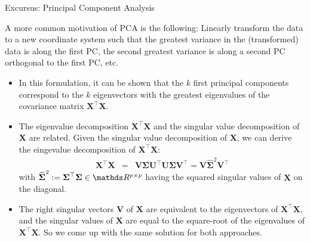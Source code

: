 \begin{vbframe}{Excursus: Principal Component Analysis}
\framebreak

A more common motivation of PCA is the following: Linearly transform the data to a new coordinate system such that the greatest variance in the (transformed) data is along the first PC, the second greatest variance is along a second PC orthogonal to the first PC, etc. 

\begin{itemize}
	\item In this formulation, it can be shown that the $k$ first principal components correspond to the $k$ eigenvectors with the greatest eigenvalues of the covariance matrix $\bm{X}^\top \bm{X}$. 
	\item The eigenvalue decomposition $\bm{X}^\top \bm{X}$ and the singular value decomposition of $\bm{X}$ are related. Given the singular value decomposition of $\bm{X}$, we can derive the eingevalue decomposition of $\bm{X}^\top \bm{X}$:  
	\begin{eqnarray*}
		\bm{X}^\top \bm{X} &=& \bm{V} \boldsymbol{\Sigma} \bm{U}^\top\bm{U} \boldsymbol{\Sigma} \bm{V}^\top = \bm{V} \boldsymbol{\widehat\Sigma}^2 \bm{V}^\top
	\end{eqnarray*}
	with $\boldsymbol{\widehat\Sigma}^2 := \boldsymbol{\Sigma}^\top \boldsymbol{\Sigma} \in \R^{p \times p}$ having the squared singular values of $\bm{X}$ on the diagonal.
	\item The right singular vectors $\bm{V}$ of $\bm{X}$ are equivalent to the eigenvectors of $\bm{X}^\top \bm{X}$, and the singular values of $\bm{X}$ are equal to the square-root of the eigenvalues of $\bm{X}^\top\bm{X}$. So we come up with the same solution for both approaches. 
\end{itemize}

\end{vbframe}


\endlecture








